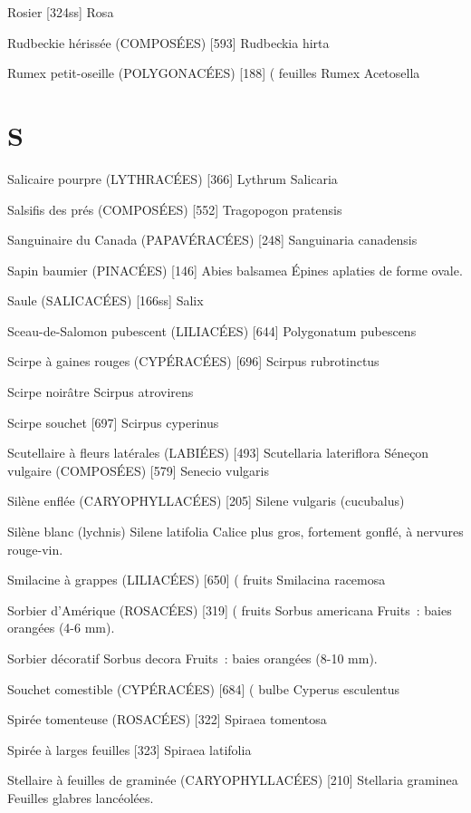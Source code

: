Rosier  [324ss]
				Rosa

Rudbeckie hérissée (COMPOSÉES)  [593]
				Rudbeckia hirta

Rumex petit-oseille (POLYGONACÉES)  [188]		( feuilles
				Rumex Acetosella

\chapter*{S}

Salicaire pourpre (LYTHRACÉES)  [366]
				Lythrum Salicaria

Salsifis des prés (COMPOSÉES)  [552]
				Tragopogon pratensis


Sanguinaire du Canada (PAPAVÉRACÉES)  [248]
				Sanguinaria canadensis

Sapin baumier (PINACÉES) [146]
				Abies balsamea
Épines aplaties de forme ovale.

Saule (SALICACÉES)  [166ss]
				Salix

Sceau-de-Salomon pubescent (LILIACÉES)  [644]
				Polygonatum pubescens

Scirpe à gaines rouges (CYPÉRACÉES)  [696]
				Scirpus rubrotinctus

Scirpe noirâtre
				Scirpus atrovirens

Scirpe souchet  [697]
				Scirpus cyperinus

Scutellaire à fleurs latérales (LABIÉES)  [493]
				Scutellaria lateriflora
Séneçon vulgaire (COMPOSÉES)  [579]
				Senecio vulgaris

Silène enflée (CARYOPHYLLACÉES)  [205]
				Silene vulgaris (cucubalus)

Silène blanc (lychnis)
				Silene latifolia
Calice plus gros, fortement gonflé, à nervures rouge-vin.

Smilacine à grappes (LILIACÉES)  [650]			( fruits
				Smilacina racemosa

Sorbier d’Amérique (ROSACÉES)  [319]			( fruits
				Sorbus americana
Fruits : baies orangées (4-6 mm).

Sorbier décoratif
				Sorbus decora
Fruits : baies orangées (8-10 mm).

Souchet comestible (CYPÉRACÉES)  [684]			( bulbe
				Cyperus esculentus

Spirée tomenteuse (ROSACÉES)  [322]
				Spiraea tomentosa

Spirée à larges feuilles  [323]
				Spiraea latifolia

Stellaire à feuilles de graminée (CARYOPHYLLACÉES)  [210]
				Stellaria graminea
Feuilles glabres lancéolées.

